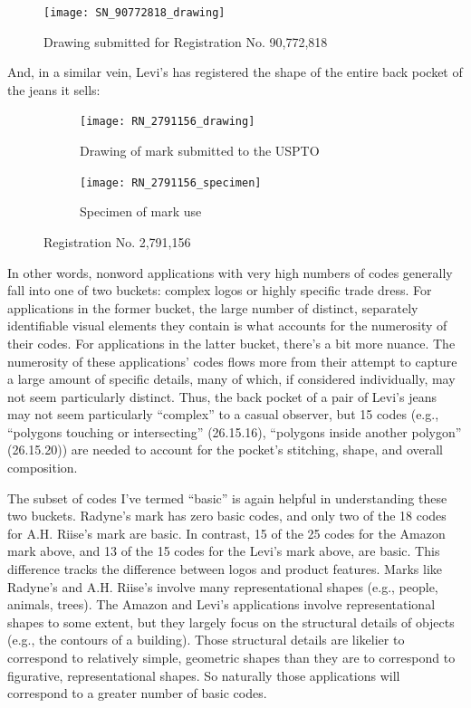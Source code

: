 \documentclass[letterpaper, 11pt, oneside]{article}
\begin{document}
\begin{figure}[H]
\centering
\texttt{[image: SN\_90772818\_drawing]} \
\caption*{Drawing submitted for Registration No. 90,772,818}
\end{figure}
\par

\noindent And, in a similar vein, Levi's has registered the shape of the entire back pocket of the jeans it sells:

\begin{figure}[H]
\centering
\begin{subfigure}[h]{0.25\linewidth}
\texttt{[image: RN\_2791156\_drawing]} \
\caption{Drawing of mark submitted to the USPTO}
\end{subfigure}
\hspace{30pt}
\begin{subfigure}[h]{0.25\linewidth}
\texttt{[image: RN\_2791156\_specimen]} \
\caption{Specimen of mark use}
\end{subfigure}
\caption*{Registration No. 2,791,156}
\end{figure}
\par

In other words, nonword applications with very high numbers of codes generally fall into one of two buckets: complex logos or highly specific trade dress. For applications in the former bucket, the large number of distinct, separately identifiable visual elements they contain is what accounts for the numerosity of their codes. For applications in the latter bucket, there's a bit more nuance. The numerosity of these applications' codes flows more from their attempt to capture a large amount of specific details, many of which, if considered individually, may not seem particularly distinct. Thus, the back pocket of a pair of Levi's jeans may not seem particularly ``complex'' to a casual observer, but 15 codes (e.g., ``polygons touching or intersecting'' (26.15.16),  ``polygons inside another polygon'' (26.15.20)) are needed to account for the pocket's stitching, shape, and overall composition.

The subset of codes I've termed ``basic'' is again helpful in understanding these two buckets. Radyne's mark has zero basic codes, and only two of the 18 codes for A.H. Riise's mark are basic. In contrast, 15 of the 25 codes for the Amazon mark above, and 13 of the 15 codes for the Levi's mark above, are basic. This difference tracks the difference between logos and product features. Marks like Radyne's and A.H. Riise's involve many representational shapes (e.g., people, animals, trees). The Amazon and Levi's applications involve representational shapes to some extent, but they largely focus on the structural details of objects (e.g., the contours of a building). Those structural details are likelier to correspond to relatively simple, geometric shapes than they are to correspond to figurative, representational shapes. So naturally those applications will correspond to a greater number of basic codes. 
\end{document}
